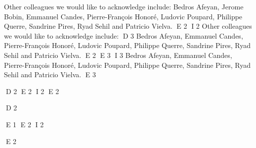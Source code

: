 Other colleagues we would like to acknowledge include:
Bedros Afeyan, Jerome Bobin, Emmanuel Candes, Pierre-Fran{\c{c}}ois Honor\'e, Ludovic Poupard, 
Philippe Querre, Sandrine Pires, Ryad Sehil and Patricio Vielva.
E 2
I 2
Other colleagues we would like to acknowledge include:
D 3
Bedros Afeyan,  Emmanuel Candes, Pierre-Fran{\c{c}}ois Honor\'e, Ludovic Poupard, 
Philippe Querre, Sandrine Pires, Ryad Sehil and Patricio Vielva.
E 2
E 3
I 3
Bedros Afeyan, Emmanuel Candes, Pierre-Fran{\c{c}}ois Honor\'e, Ludovic Poupard, Philippe Querre, Sandrine Pires, Ryad Sehil and Patricio Vielva.
E 3

D 2
\newpage
E 2
I 2
\newpage
E 2
\thispagestyle{empty}
$ $
\newpage

D 2

E 1
E 2
I 2

E 2
